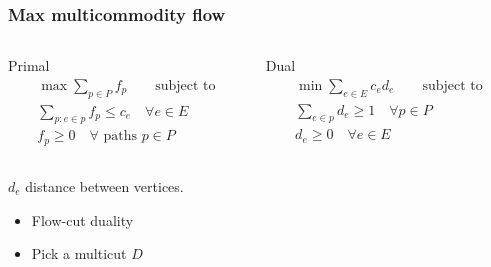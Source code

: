 \documentclass[12pt,aspectratio=169]{beamer}
\begin{document}
\begin{frame}\frametitle{Max multicommodity flow }
\begin{columns} 
  \begin{column}{0.48\textwidth}
  \begin{block}{Primal}
    \begin{equation}
    \begin{split}
      \max \sum_{p\in P} f_{p}\qquad\text{subject to}\\
      \sum_{p: e\in p} f_{p}\le c_{e}\quad \forall e\in E\\
      f_{p}\ge 0\quad \forall \text{ paths } p\in P
     \end{split}
   \end{equation}
 \end{block}
\end{column}
\begin{column}{0.48\textwidth}
  \begin{block}{Dual}
    \begin{equation}
    \begin{split}
      \min \sum_{e\in E} c_{e}d_{e} \qquad\text{subject to}\\
      \sum_{e\in p} d_{e}\ge 1\quad \forall p\in P\\
      d_{e}\ge 0\quad \forall e\in E
     \end{split}
   \end{equation}
 \end{block}
\end{column}
\end{columns}

\centering
\begin{block}{$d_{e}$}
  distance between vertices.
%
\end{block}
\begin{itemize}
\item
  Flow-cut duality
\item
  Pick a multicut $D$
\end{itemize}
\end{frame}
\end{document}
